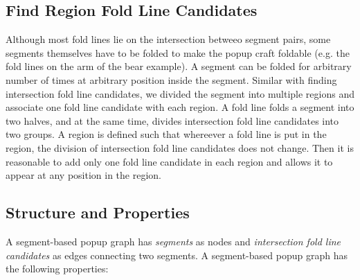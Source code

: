 

\subsection{Find Region Fold Line Candidates} \label{region_fold_line_candidates}
Although most fold lines lie on the intersection betweeo segment pairs, some segments themselves have to be folded to make the popup craft foldable (e.g. the fold lines on the arm of the bear example). A segment can be folded for arbitrary number of times at arbitrary position inside the segment. Similar with finding intersection fold line candidates, we divided the segment into multiple regions and associate one fold line candidate with each region. A fold line folds a segment into two halves, and at the same time, divides intersection fold line candidates into two groups. A region is defined such that whereever a fold line is put in the region, the division of intersection fold line candidates does not change. Then it is reasonable to add only one fold line candidate in each region and allows it to appear at any position in the region.


\subsection{Structure and Properties} \label{popup_graph_structure}
A segment-based popup graph has \textit{segments} as nodes and \textit{intersection fold line candidates} as edges connecting two segments. A segment-based popup graph has the following properties:

